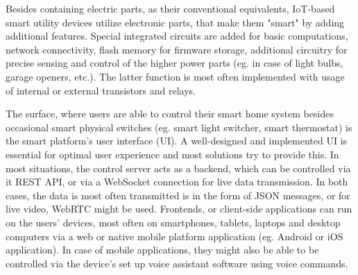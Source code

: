 Besides containing electric parts, as their conventional equivalents, IoT-based smart utility devices utilize electronic parts, that make them "smart" by adding additional features. Special integrated circuits are added for basic computations, network connectivity, flash memory for firmware storage, additional circuitry for precise sensing and control of the higher power parts (eg. in case of light bulbs, garage openers, etc.). The latter function is most often implemented with usage of internal or external transistors and relays.

The surface, where users are able to control their smart home system besides occasional smart physical switches (eg. smart light switcher, smart thermostat) is the smart platform's user interface (UI). A well-designed and implemented UI is essential for optimal user experience and most solutions try to provide this. In most situations, the control server acts as a backend, which can be controlled via it REST API, or via a WebSocket connection for live data transmission. In both cases, the data is most often transmitted is in the form of JSON messages, or for live video, WebRTC might be used. Frontends, or client-side applications can run on the users' devices, most often on smartphones, tablets, laptops and desktop computers via a web or native mobile platform application (eg. Android or iOS application). In case of mobile applications, they might also be able to be controlled via the device's set up voice assistant software using voice commands.
